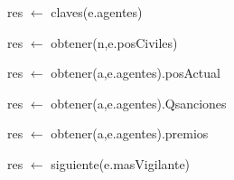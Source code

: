 \begin{algorithm}[H]
\begin{algorithmic}[1]
 
  \State res $\gets$ claves(e.agentes) 
\EndFunction
\end{algorithmic}
\end{algorithm}

\begin{algorithm}[H]
\begin{algorithmic}[1]
 
    \State res $\gets$ obtener(n,e.posCiviles)
\EndFunction
\end{algorithmic}
\end{algorithm}

\begin{algorithm}[H]
\begin{algorithmic}[1]
 
    \State res $\gets$ obtener(a,e.agentes).posActual
\EndFunction
\end{algorithmic}
\end{algorithm}

\begin{algorithm}[H]
\begin{algorithmic}[1]
 
    \State res $\gets$ obtener(a,e.agentes).Qsanciones
\EndFunction
\end{algorithmic}
\end{algorithm}

\begin{algorithm}[H]
\begin{algorithmic}[1]
 
    \State res $\gets$ obtener(a,e.agentes).premios
\EndFunction
\end{algorithmic}
\end{algorithm}

\begin{algorithm}[H]
\begin{algorithmic}[1]
 
    \State res $\gets$ siguiente(e.masVigilante)
\EndFunction
\end{algorithmic}
\end{algorithm}


